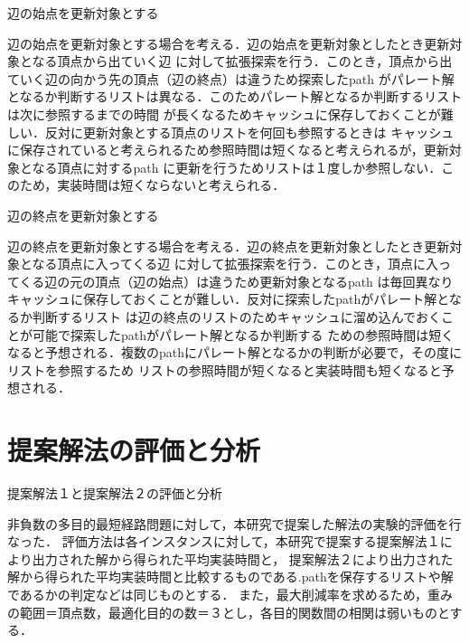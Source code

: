 \documentclass[12pt]{optlab-bachelor}
\begin{document}
\begin{description}
  \item[辺の始点を更新対象とする]
\end{description}

辺の始点を更新対象とする場合を考える．辺の始点を更新対象としたとき更新対象となる頂点から出ていく辺
に対して拡張探索を行う．このとき，頂点から出ていく辺の向かう先の頂点（辺の終点）は違うため探索したpath
がパレート解となるか判断するリストは異なる．このためパレート解となるか判断するリストは次に参照するまでの時間
が長くなるためキャッシュに保存しておくことが難しい．反対に更新対象とする頂点のリストを何回も参照するときは
キャッシュに保存されていると考えられるため参照時間は短くなると考えられるが，更新対象となる頂点に対するpath
に更新を行うためリストは１度しか参照しない．このため，実装時間は短くならないと考えられる．

\begin{description}
  \item[辺の終点を更新対象とする]
\end{description}

辺の終点を更新対象とする場合を考える．辺の終点を更新対象としたとき更新対象となる頂点に入ってくる辺
に対して拡張探索を行う．このとき，頂点に入ってくる辺の元の頂点（辺の始点）は違うため更新対象となるpath
は毎回異なりキャッシュに保存しておくことが難しい．反対に探索したpathがパレート解となるか判断するリスト
は辺の終点のリストのためキャッシュに溜め込んでおくことが可能で探索したpathがパレート解となるか判断する
ための参照時間は短くなると予想される．複数のpathにパレート解となるかの判断が必要で，その度にリストを参照するため
リストの参照時間が短くなると実装時間も短くなると予想される．

\section{提案解法の評価と分析}

\begin{description}
  \item[提案解法１と提案解法２の評価と分析]
\end{description}

非負数の多目的最短経路問題に対して，本研究で提案した解法の実験的評価を行なった．
評価方法は各インスタンスに対して，本研究で提案する提案解法１により出力された解から得られた平均実装時間と，
提案解法２により出力された解から得られた平均実装時間と比較するものである.pathを保存するリストや解であるかの判定などは同じものとする．
また，最大削減率を求めるため，重みの範囲＝頂点数，最適化目的の数＝３とし，各目的関数間の相関は弱いものとする．
\end{document}
